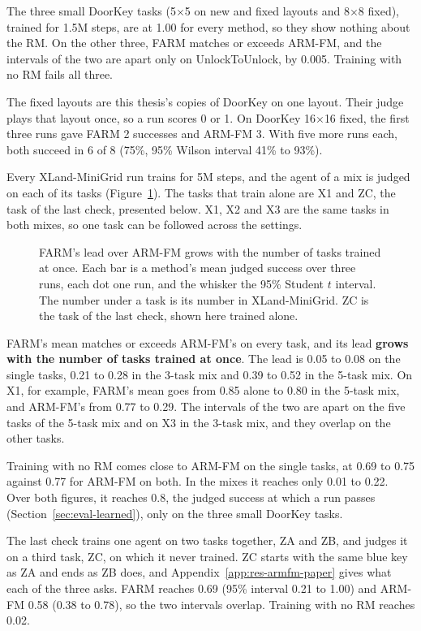 \documentclass[11pt,english,listoffigures,listoftables]{tfgetsinf}
\begin{document}
The three small DoorKey tasks (5$\times$5 on new and fixed layouts and 8$\times$8 fixed), trained for 1.5M steps, are at 1.00 for every method, so they show nothing about the RM. On the other three, FARM matches or exceeds ARM-FM, and the intervals of the two are apart only on UnlockToUnlock, by 0.005. Training with no RM fails all three.

The fixed layouts are this thesis's copies of DoorKey on one layout. Their judge plays that layout once, so a run scores 0 or 1. On DoorKey 16$\times$16 fixed, the first three runs gave FARM 2 successes and ARM-FM 3. With five more runs each, both succeed in 6 of 8 (75\%, 95\% Wilson interval 41\% to 93\%).

Every XLand-MiniGrid run trains for 5M steps, and the agent of a mix is judged on each of its tasks (Figure~\ref{fig:res-armfm-xland}). The tasks that train alone are X1 and ZC, the task of the last check, presented below. X1, X2 and X3 are the same tasks in both mixes, so one task can be followed across the settings.

\begin{figure}[!htb]
\centering

\caption[Judged success on the XLand-MiniGrid tasks]{FARM's lead over ARM-FM grows with the number of tasks trained at once. Each bar is a method's mean judged success over three runs, each dot one run, and the whisker the 95\% Student $t$ interval. The number under a task is its number in XLand-MiniGrid. ZC is the task of the last check, shown here trained alone.}
\label{fig:res-armfm-xland}
\end{figure}

FARM's mean matches or exceeds ARM-FM's on every task, and its lead \textbf{grows with the number of tasks trained at once}. The lead is 0.05 to 0.08 on the single tasks, 0.21 to 0.28 in the 3-task mix and 0.39 to 0.52 in the 5-task mix. On X1, for example, FARM's mean goes from 0.85 alone to 0.80 in the 5-task mix, and ARM-FM's from 0.77 to 0.29. The intervals of the two are apart on the five tasks of the 5-task mix and on X3 in the 3-task mix, and they overlap on the other tasks.

Training with no RM comes close to ARM-FM on the single tasks, at 0.69 to 0.75 against 0.77 for ARM-FM on both. In the mixes it reaches only 0.01 to 0.22. Over both figures, it reaches 0.8, the judged success at which a run passes (Section~\ref{sec:eval-learned}), only on the three small DoorKey tasks.

The last check trains one agent on two tasks together, ZA and ZB, and judges it on a third task, ZC, on which it never trained. ZC starts with the same blue key as ZA and ends as ZB does, and Appendix~\ref{app:res-armfm-paper} gives what each of the three asks. FARM reaches 0.69 (95\% interval 0.21 to 1.00) and ARM-FM 0.58 (0.38 to 0.78), so the two intervals overlap. Training with no RM reaches 0.02.
\end{document}
